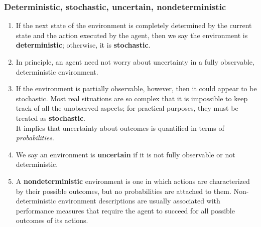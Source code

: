 \subsubsection{Deterministic, stochastic, uncertain, nondeterministic}
\begin{enumerate}
    \item If the next state of the environment is completely determined by the current state and the action executed by the agent, then we say the environment is \textbf{deterministic}; otherwise, it is \textbf{stochastic}.
    \hfill \cite{ai/book/Artificial-Intelligence-A-Modern-Approach/Russell-Norvig}

    \item In principle, an agent need not worry about uncertainty in a fully observable, deterministic environment.
    \hfill \cite{ai/book/Artificial-Intelligence-A-Modern-Approach/Russell-Norvig}

    \item  If the environment is partially observable, however, then it could appear to be stochastic. Most real situations are so complex that it is impossible to keep track of all the unobserved aspects; for practical purposes, they must be treated as \textbf{stochastic}.
    \hfill \cite{ai/book/Artificial-Intelligence-A-Modern-Approach/Russell-Norvig}
    \\
    It implies that uncertainty about outcomes is quantified in terms of \textit{probabilities}.
    \hfill \cite{ai/book/Artificial-Intelligence-A-Modern-Approach/Russell-Norvig}

    \item  We say an environment is \textbf{uncertain} if it is not fully observable or not deterministic.
    \hfill \cite{ai/book/Artificial-Intelligence-A-Modern-Approach/Russell-Norvig}

    \item A \textbf{nondeterministic} environment is one in which actions are characterized by their possible outcomes, but no probabilities are attached to them. Non-deterministic environment descriptions are usually associated with performance measures that require the agent to succeed for all possible outcomes of its actions.
    \hfill \cite{ai/book/Artificial-Intelligence-A-Modern-Approach/Russell-Norvig}
\end{enumerate}


